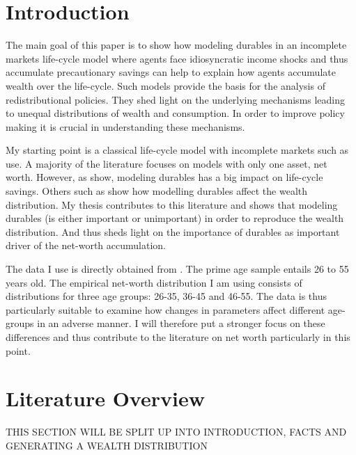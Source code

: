 \documentclass[a4paper,12pt]{article}
\begin{document}


\setcounter{page}{1}        %


\section{Introduction}
\label{Chapter1}

The main goal of this paper is to show how modeling durables in an incomplete markets life-cycle model where agents face idiosyncratic income shocks and thus accumulate precautionary savings can help to explain how agents accumulate wealth over the life-cycle. Such models provide the basis for the analysis of redistributional policies. They shed light on the underlying mechanisms leading to unequal distributions of wealth and consumption. In order to improve policy making it is crucial in understanding these mechanisms. 

My starting point is a classical life-cycle model with incomplete markets such as \cite{hintermaier2011} use. A majority of the literature focuses on models with only one asset, net worth. However, as \cite{FV&K2011} show, modeling durables has a big impact on life-cycle savings. Others such as \cite{diaz2010} show how modelling durables affect the wealth distribution. My thesis contributes to this literature and shows that modeling durables (is either important or unimportant) in order to reproduce the wealth distribution. And thus sheds light on the importance of durables as important driver of the net-worth accumulation. 

The data I use is directly obtained from \cite{hintermaier2011}. The prime age sample entails 26 to 55 years old. The empirical net-worth distribution I am using consists of distributions for three age groups: 26-35, 36-45 and 46-55. The data is thus particularly suitable to examine how changes in parameters affect different age-groups in an adverse manner. I will therefore put a stronger focus on these differences and thus contribute to the literature on net worth particularly in this point. 



\section{Literature Overview}
\label{Chapter2}

THIS SECTION WILL BE SPLIT UP INTO INTRODUCTION, FACTS AND GENERATING A WEALTH DISTRIBUTION
\end{document}
